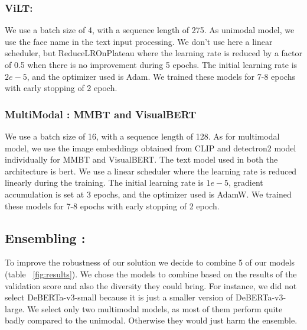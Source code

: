 \documentclass[11pt]{article}
\begin{document}
\subsubsection{ViLT:}
We use a batch size of 4, with a sequence length of 275. As unimodal model, we use the face name in the text input processing. We don't use here a linear scheduler, but ReduceLROnPlateau where the learning rate is reduced by a factor of 0.5 when there is no improvement during  5 epochs. The initial learning rate is $2e-5$, and the optimizer used is Adam. We trained these models for 7-8 epochs with early stopping of 2 epoch.

\subsubsection{MultiModal : MMBT and VisualBERT}
We use a batch size of 16, with a sequence length of 128. As for multimodal model, we use the image embeddings obtained from CLIP\cite{radford2021learning} and detectron2 \cite{ren2015faster} model individually for MMBT and VisualBERT. The text model used in both the architecture is bert.  We use a linear scheduler where the learning rate is reduced linearly during the training. The initial learning rate is $1e-5$, gradient accumulation is set at 3 epochs, and the optimizer used is AdamW. We trained these models for 7-8 epochs with early stopping of 2 epoch.
\subsection{Ensembling :}
To improve the robustness of our solution we decide to combine 5 of our models (table ~\ref{fig:results}). We chose the models to combine based on the results of the validation score and also the diversity they could bring. For instance, we did not select DeBERTa-v3-small because it is just a smaller version of DeBERTa-v3-large. We select only two multimodal models, as most of them perform quite badly compared to the unimodal. Otherwise they would just harm the ensemble.
\end{document}
